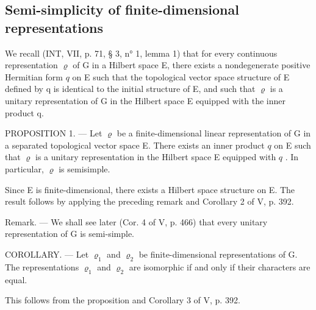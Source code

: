 \subsection{Semi-simplicity of finite-dimensional representations}

We recall (INT, VII, p. 71, § 3, n° 1, lemma 1) that for every continuous representation \(\varrho\) of G in a Hilbert space E, there exists a nondegenerate positive Hermitian form \(q\) on E such that the topological vector space structure of E defined by q is identical to the initial structure of E, and such that \(\varrho\) is a unitary representation of G in the Hilbert space E equipped with the inner product q.

PROPOSITION 1. --- Let \(\varrho\) be a finite-dimensional linear representation of G in a separated topological vector space E. There exists an inner product \(q\) on E such that \(\varrho\) is a unitary representation in the Hilbert space E equipped with \(q\) . In particular, \(\varrho\) is semisimple.

Since E is finite-dimensional, there exists a Hilbert space structure on E. The result follows by applying the preceding remark and Corollary 2 of V, p. 392.

Remark. --- We shall see later (Cor. 4 of V, p. 466) that every unitary representation of G is semi-simple.

COROLLARY. --- Let \(\varrho_{1}\) and \(\varrho_{2}\) be finite-dimensional representations of G. The representations \(\varrho_{1}\) and \(\varrho_{2}\) are isomorphic if and only if their characters are equal.

This follows from the proposition and Corollary 3 of V, p. 392.

